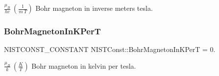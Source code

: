 $\frac{\mu_B}{hc} \ (\frac{1}{m\ T})$ Bohr magneton in inverse meters tesla. \mbox{\label{group___n_i_s_t_const-_bohr_magneton_gab847d7f91c3980277d352fd100d904f2}} 
\subsubsection{\texorpdfstring{Bohr\+Magneton\+In\+K\+PerT}{BohrMagnetonInKPerT}}
{\footnotesize\ttfamily N\+I\+S\+T\+C\+O\+N\+S\+T\+\_\+\+C\+O\+N\+S\+T\+A\+NT N\+I\+S\+T\+Const\+::\+Bohr\+Magneton\+In\+K\+PerT = 0.}

$\frac{\mu_B}{k} \ (\frac{K}{T})$ Bohr magneton in kelvin per tesla. 